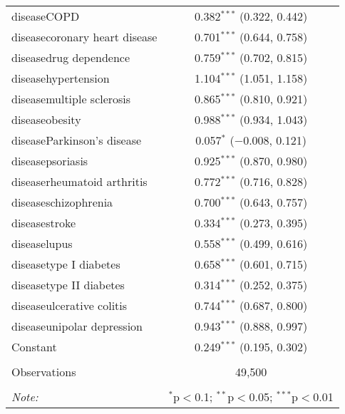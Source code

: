 \begin{table}[!htbp]
\begin{tabular}{@{\extracolsep{5pt}}lc}
  diseaseCOPD & 0.382$^{***}$ (0.322, 0.442) \\ 
  diseasecoronary heart disease & 0.701$^{***}$ (0.644, 0.758) \\ 
  diseasedrug dependence & 0.759$^{***}$ (0.702, 0.815) \\ 
  diseasehypertension & 1.104$^{***}$ (1.051, 1.158) \\ 
  diseasemultiple sclerosis & 0.865$^{***}$ (0.810, 0.921) \\ 
  diseaseobesity & 0.988$^{***}$ (0.934, 1.043) \\ 
  diseaseParkinson's disease & 0.057$^{*}$ ($-$0.008, 0.121) \\ 
  diseasepsoriasis & 0.925$^{***}$ (0.870, 0.980) \\ 
  diseaserheumatoid arthritis & 0.772$^{***}$ (0.716, 0.828) \\ 
  diseaseschizophrenia & 0.700$^{***}$ (0.643, 0.757) \\ 
  diseasestroke & 0.334$^{***}$ (0.273, 0.395) \\ 
  diseaselupus & 0.558$^{***}$ (0.499, 0.616) \\ 
  diseasetype I diabetes & 0.658$^{***}$ (0.601, 0.715) \\ 
  diseasetype II diabetes & 0.314$^{***}$ (0.252, 0.375) \\ 
  diseaseulcerative colitis & 0.744$^{***}$ (0.687, 0.800) \\ 
  diseaseunipolar depression & 0.943$^{***}$ (0.888, 0.997) \\ 
  Constant & 0.249$^{***}$ (0.195, 0.302) \\ 
 \hline \\[-1.8ex] 
Observations & 49,500 \\ 
\hline 
\hline \\[-1.8ex] 
\textit{Note:}  & \multicolumn{1}{r}{$^{*}$p$<$0.1; $^{**}$p$<$0.05; $^{***}$p$<$0.01} \\ 
\end{tabular} 
\end{table} 

